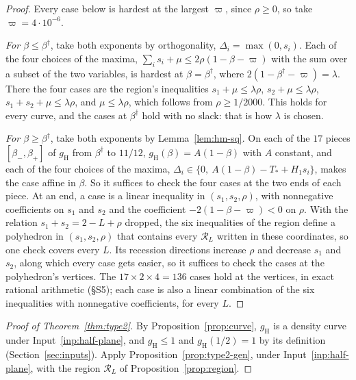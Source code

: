 \documentclass[11pt]{article}
\theoremstyle{definition}
\begin{document}
\begin{proof}
Every case below is hardest at the largest $\varpi$, since $\rho \ge 0$, so take $\varpi = 4 \cdot 10^{-6}$.

\emph{For $\beta \le \beta^\dagger$}, take both exponents by orthogonality, $\Delta_i = \max(0, s_i)$. Each of the four
choices of the maxima, $\sum_i s_i + \mu \le 2\rho(1 - \beta - \varpi)$ with the sum over a subset of the two
variables, is
hardest at $\beta = \beta^\dagger$, where $2(1 - \beta^\dagger - \varpi) = \lambda$. There the four cases are the
region's inequalities $s_1 + \mu \le \lambda\rho$, $s_2 + \mu \le \lambda\rho$, $s_1 + s_2 + \mu \le \lambda\rho$, and
$\mu \le \lambda\rho$, which follows from $\rho \ge 1/2000$. This holds for every curve, and the cases at
$\beta^\dagger$ hold with no slack: that is how $\lambda$ is chosen.

\emph{For $\beta \ge \beta^\dagger$}, take both exponents by Lemma~\ref{lem:hm-sq}. On each of the $17$ pieces
$[\beta_-, \beta_+]$ of $g_{\mathrm H}$ from $\beta^\dagger$ to $11/12$, $g_{\mathrm H}(\beta) = A(1 - \beta)$ with $A$
constant, and each of the four choices of the maxima, $\Delta_i \in \{0,\ A(1 - \beta) - T_* + H_1 s_i\}$, makes the
case affine in $\beta$. So it suffices to check the four cases at the two ends of each piece. At an end, a case is a
linear inequality in $(s_1, s_2, \rho)$, with nonnegative coefficients on $s_1$ and $s_2$ and the coefficient $-2(1 -
\beta - \varpi) < 0$ on $\rho$. With the relation $s_1 + s_2 = 2 - L + \rho$ dropped, the six inequalities of the
region define a polyhedron in $(s_1, s_2, \rho)$ that contains every $\mathcal R_L$ written in these coordinates, so
one check covers every $L$. Its
recession directions increase $\rho$ and decrease $s_1$ and $s_2$, along which every case gets
easier, so it suffices to check the cases at the polyhedron's vertices. The $17 \times 2 \times 4 = 136$ cases hold at
the vertices, in exact rational arithmetic (\S S5); each case is also a linear combination of the six inequalities with
nonnegative coefficients, for every $L$.
\end{proof}

\begin{proof}[Proof of Theorem~\ref{thm:type2}]
By Proposition~\ref{prop:curve}, $g_{\mathrm H}$ is a density curve under Input~\ref{inp:half-plane}, and
$g_{\mathrm H} \le 1$ and $g_{\mathrm H}(1/2) = 1$ by its definition (Section~\ref{sec:inputs}). Apply
Proposition~\ref{prop:type2-gen}, under
Input~\ref{inp:half-plane}, with the region $\mathcal R_L$ of Proposition~\ref{prop:region}.
\end{proof}
\end{document}
